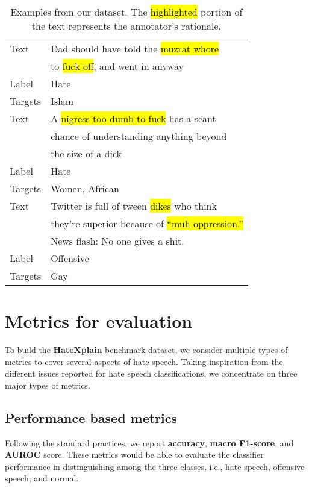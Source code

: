 \documentclass[letterpaper]{article} \usepackage{aaai21}  \usepackage{times}  \usepackage{helvet} \usepackage{courier}  \usepackage[hyphens]{url}  \usepackage{graphicx} \urlstyle{rm} \def\UrlFont{\rm}  \usepackage{natbib}  \usepackage{caption}
\begin{document}
\begin{table}[t]
\centering
\scriptsize
\begin{tabular}{ll}
\toprule
Text & Dad should have told the \hl{muzrat whore} \\
&to \hl{fuck off}, and went in anyway\\
Label & Hate \\
Targets & Islam \\ 
\midrule
Text & A \hl{nigress too dumb to fuck} has a scant \\
&chance of understanding anything beyond\\
&the size of a dick \\
Label & Hate \\
Targets & Women, African \\ 
\midrule
Text & Twitter is full of tween \hl{dikes} who think \\
&they're superior because of \hl{``muh oppression.''} \\
&News flash: No one gives a shit. \\
Label & Offensive \\
Targets & Gay \\ 

\bottomrule
\end{tabular}
\caption{Examples from our dataset. The \hl{highlighted} portion of the text represents the annotator's rationale.}

\label{tab:dataset_example}
\end{table}




 
\section{Metrics for evaluation}
To build the {\bf{HateXplain}} benchmark dataset, we consider multiple types of metrics to cover several aspects of hate speech. Taking inspiration from the different issues reported for hate speech classifications, we concentrate on three major types of metrics.

\subsection{Performance based metrics}
Following the standard practices, we report \textbf{accuracy}, \textbf{macro F1-score}, and \textbf{AUROC} score. These metrics would be able to evaluate the classifier performance in distinguishing among the three classes, i.e., hate speech, offensive speech, and normal.
\end{document}
